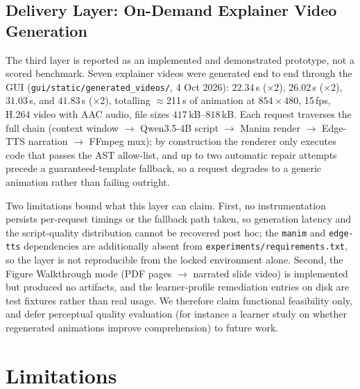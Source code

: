 \documentclass[conference]{IEEEtran}
\begin{document}
\subsection{Delivery Layer: On-Demand Explainer Video Generation}
\label{sec:delivery}

The third layer is reported as an implemented and demonstrated prototype, not a scored benchmark. Seven explainer videos were generated end to end through the GUI (\texttt{gui/static/generated\_videos/}, 4 Oct 2026): $22.34$\,s ($\times$2), $26.02$\,s ($\times$2), $31.03$\,s, and $41.83$\,s ($\times$2), totalling $\approx$211\,s of animation at $854\times480$, 15\,fps, H.264 video with AAC audio, file sizes $417$\,kB--$818$\,kB. Each request traverses the full chain (context window $\to$ Qwen3.5-4B script $\to$ Manim render $\to$ Edge-TTS narration $\to$ FFmpeg mux); by construction the renderer only executes code that passes the AST allow-list, and up to two automatic repair attempts precede a guaranteed-template fallback, so a request degrades to a generic animation rather than failing outright.

Two limitations bound what this layer can claim. First, no instrumentation persists per-request timings or the fallback path taken, so generation latency and the script-quality distribution cannot be recovered post hoc; the \texttt{manim} and \texttt{edge-tts} dependencies are additionally absent from \texttt{experiments/requirements.txt}, so the layer is not reproducible from the locked environment alone. Second, the Figure Walkthrough mode (PDF pages $\to$ narrated slide video) is implemented but produced no artifacts, and the learner-profile remediation entries on disk are test fixtures rather than real usage. We therefore claim functional feasibility only, and defer perceptual quality evaluation (for instance a learner study on whether regenerated animations improve comprehension) to future work.

\section{Limitations}
\end{document}
